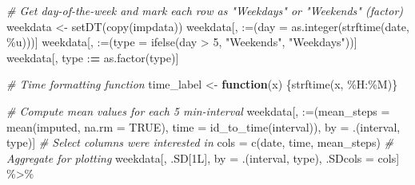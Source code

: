 \documentclass[
  paper=a4,
  ,captions=tableheading
]{scrartcl}
\newenvironment{Shaded}{\begin{snugshade}}{\end{snugshade}}
\newcommand{\AttributeTok}[1]{\textcolor[rgb]{0.77,0.63,0.00}{#1}}
\newcommand{\CommentTok}[1]{\textcolor[rgb]{0.56,0.35,0.01}{\textit{#1}}}
\newcommand{\ConstantTok}[1]{\textcolor[rgb]{0.00,0.00,0.00}{#1}}
\newcommand{\ControlFlowTok}[1]{\textcolor[rgb]{0.13,0.29,0.53}{\textbf{#1}}}
\newcommand{\DecValTok}[1]{\textcolor[rgb]{0.00,0.00,0.81}{#1}}
\newcommand{\ErrorTok}[1]{\textcolor[rgb]{0.64,0.00,0.00}{\textbf{#1}}}
\newcommand{\FunctionTok}[1]{\textcolor[rgb]{0.00,0.00,0.00}{#1}}
\newcommand{\NormalTok}[1]{#1}
\newcommand{\OtherTok}[1]{\textcolor[rgb]{0.56,0.35,0.01}{#1}}
\newcommand{\SpecialCharTok}[1]{\textcolor[rgb]{0.00,0.00,0.00}{#1}}
\newcommand{\StringTok}[1]{\textcolor[rgb]{0.31,0.60,0.02}{#1}}
\begin{document}
\begin{Shaded}
\begin{Highlighting}[]
\CommentTok{\# Get day{-}of{-}the{-}week and mark each row as "Weekdays" or "Weekends" (factor)}
\NormalTok{weekdata }\OtherTok{\textless{}{-}} \FunctionTok{setDT}\NormalTok{(}\FunctionTok{copy}\NormalTok{(impdata))}
\NormalTok{weekdata[, }\StringTok{\textasciigrave{}}\AttributeTok{:=}\StringTok{\textasciigrave{}}\NormalTok{(}\AttributeTok{day =} \FunctionTok{as.integer}\NormalTok{(}\FunctionTok{strftime}\NormalTok{(date, }\StringTok{\textquotesingle{}\%u\textquotesingle{}}\NormalTok{)))]}
\NormalTok{weekdata[, }\StringTok{\textasciigrave{}}\AttributeTok{:=}\StringTok{\textasciigrave{}}\NormalTok{(}\AttributeTok{type =} \FunctionTok{ifelse}\NormalTok{(day }\SpecialCharTok{\textgreater{}} \DecValTok{5}\NormalTok{, }\StringTok{"Weekends"}\NormalTok{, }\StringTok{"Weekdays"}\NormalTok{))]}
\NormalTok{weekdata[, type }\SpecialCharTok{:}\ErrorTok{=} \FunctionTok{as.factor}\NormalTok{(type)]}

\CommentTok{\# Time formatting function}
\NormalTok{time\_label }\OtherTok{\textless{}{-}} \ControlFlowTok{function}\NormalTok{(x) \{}\FunctionTok{strftime}\NormalTok{(x, }\StringTok{\textquotesingle{}\%H:\%M\textquotesingle{}}\NormalTok{)\}}

\CommentTok{\# Compute mean values for each 5 min{-}interval}
\NormalTok{weekdata[, }\StringTok{\textasciigrave{}}\AttributeTok{:=}\StringTok{\textasciigrave{}}\NormalTok{(}\AttributeTok{mean\_steps =} \FunctionTok{mean}\NormalTok{(imputed, }\AttributeTok{na.rm =} \ConstantTok{TRUE}\NormalTok{),}
                \AttributeTok{time =} \FunctionTok{id\_to\_time}\NormalTok{(interval)),}
\NormalTok{     by }\OtherTok{=}\NormalTok{ .(interval, type)]}
\CommentTok{\# Select columns we\textquotesingle{}re interested in}
\NormalTok{cols }\OtherTok{=} \FunctionTok{c}\NormalTok{(}\StringTok{\textquotesingle{}date\textquotesingle{}}\NormalTok{, }\StringTok{\textquotesingle{}time\textquotesingle{}}\NormalTok{, }\StringTok{\textquotesingle{}mean\_steps\textquotesingle{}}\NormalTok{)}
\CommentTok{\# Aggregate for plotting}
\NormalTok{weekdata[, .SD[1L], by }\OtherTok{=}\NormalTok{ .(interval, type), .SDcols }\OtherTok{=}\NormalTok{ cols] }\SpecialCharTok{\%\textgreater{}\%}
  

\end{Highlighting}
\end{Shaded}
\end{document}
